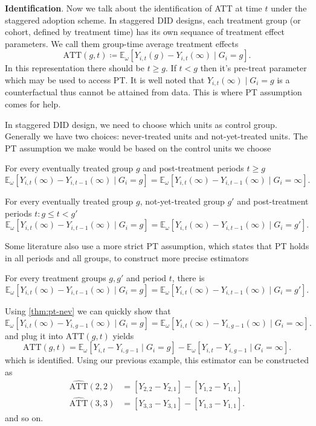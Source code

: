 \documentclass[12pt]{article}
\begin{document}
\textbf{Identification}. Now we talk about the identification of ATT at time \( t \)
under the staggered adoption scheme. In
staggered DID designs, each treatment group (or cohort, defined by treatment time) has
its own sequance of treatment effect parameters.
We call them group-time average treatment effects
\[
  \text{ATT}(g,t) \coloneqq \mathbb{E}_{\omega}[Y_{i,t}(g)-Y_{i,t}(\infty) \mid G_i = g]
.\]
In this representation there should be \( t \ge g \). If \( t < g \) then it's pre-treat
parameter which may be used to
access PT. It is well noted that \( Y_{i,t}(\infty) \mid G_i=g \) is a counterfactual
thus cannot be attained from data.
This is where PT assumption comes for help.

In staggered DID design, we need to choose which units as control group. Generally we
have two choices: never-treated units
and not-yet-treated units. The PT assumption we make would be based on the control units we choose
\begin{assumption}\label{thm:pt-nev}
  For every eventually treated group \( g \) and post-treatment periods \( t \ge g \)
  \[
    \mathbb{E}_{\omega}[Y_{i,t}(\infty)-Y_{i,t-1}(\infty) \mid G_i=g] =
    \mathbb{E}_{\omega}[Y_{i,t}(\infty)-Y_{i,t-1}(\infty) \mid G_i=\infty]
  .\]
\end{assumption}

\begin{assumption}\label{thm:pt-not-yet}
  For every eventually treated group \( g \), not-yet-treated group \( g' \) and
  post-treatment periods \( t: g \le t < g' \)
  \[
    \mathbb{E}_{\omega}[Y_{i,t}(\infty)-Y_{i,t-1}(\infty) \mid G_i=g] =
    \mathbb{E}_{\omega}[Y_{i,t}(\infty)-Y_{i,t-1}(\infty) \mid G_i=g']
  .\]
\end{assumption}

Some literature also use a more strict PT assumption, which states that PT holds in all
periods and all groups, to construct
more precise estimators
\begin{assumption}\label{thm:pt-all}
  For every treatment groups \( g,g' \) and period \( t \), there is
  \[
    \mathbb{E}_{\omega}[Y_{i,t}(\infty)-Y_{i,t-1}(\infty) \mid G_i=g] =
    \mathbb{E}_{\omega}[Y_{i,t}(\infty)-Y_{i,t-1}(\infty) \mid G_i=g']
  .\]
\end{assumption}

Using \autoref{thm:pt-nev} we can quickly show that
\[
  \mathbb{E}_{\omega}[Y_{i,t}(\infty)-Y_{i,g-1}(\infty) \mid G_i=g] =
  \mathbb{E}_{\omega}[Y_{i,t}(\infty)-Y_{i,g-1}(\infty) \mid G_i=\infty]
.\]
and plug it into \( \text{ATT}(g,t) \) yields
\[
  \text{ATT}(g,t) = \mathbb{E}_{\omega}[Y_{i,t}-Y_{i,g-1} \mid G_i=g] -
  \mathbb{E}_{\omega}[Y_{i,t}-Y_{i,g-1} \mid G_i=\infty]
.\]
which is identified. Using our previous example, this estimator can be constructed as
\begin{align*}
  \widehat{\text{ATT}}(2,2)&=[Y_{2,2}-Y_{2,1}] - [Y_{1,2}-Y_{1,1}] \\
  \widehat{\text{ATT}}(3,3)&=[Y_{3,3}-Y_{3,1}] - [Y_{1,3}-Y_{1,1}]
  .
\end{align*}
and so on.
\end{document}
